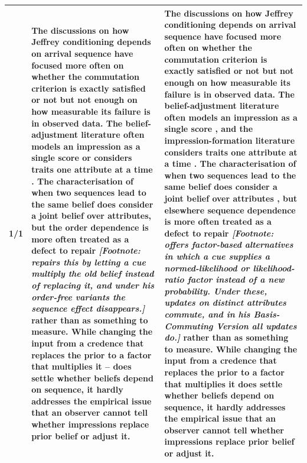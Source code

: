 \documentclass[10pt]{article}
\theoremstyle{definition}
\renewcommand{\footnote}[1]{ \textit{[Footnote: #1]}}
\begin{document}
{\begin{longtable}{|p{0.9cm}|p{12.2cm}|p{12.2cm}|}
1/1 & The discussions on how Jeffrey\citep{Jeffrey1983} conditioning depends on arrival sequence have focused more often on whether the commutation criterion is exactly satisfied or not but not enough on how measurable its failure is in observed data. The belief-adjustment literature often models an impression as a single score \citep{Hawthorne2004} or considers traits one attribute at a time \citep{Asch1946}. The characterisation of when two sequences lead to the same belief does consider a joint belief over attributes\citet{DiaconisZabell1982}, but the order dependence is more often treated as a defect to repair \footnote{\citet{Hawthorne2004} repairs this by letting a cue multiply the old belief instead of replacing it, and under his order-free variants the sequence effect disappears.} rather than as something to measure. While changing the input from a credence that replaces the prior to a factor that multiplies it -- does settle whether beliefs depend on sequence, it hardly addresses the empirical issue that an observer cannot tell whether impressions replace prior belief or adjust it. & The discussions on how Jeffrey conditioning \citep{Jeffrey1983} depends on arrival sequence have focused more often on whether the commutation criterion is exactly satisfied or not but not enough on how measurable its failure is in observed data. The belief-adjustment literature often models an impression as a single score \citep{HogarthEinhorn1992}, and the impression-formation literature considers traits one attribute at a time \citep{Asch1946}. The characterisation of when two sequences lead to the same belief does consider a joint belief over attributes \citep{DiaconisZabell1982}, but elsewhere sequence dependence is more often treated as a defect to repair\footnote{\citet{Hawthorne2004} offers factor-based alternatives in which a cue supplies a normed-likelihood or likelihood-ratio factor instead of a new probability. Under these, updates on distinct attributes commute, and in his Basis-Commuting Version all updates do.} rather than as something to measure. While changing the input from a credence that replaces the prior to a factor that multiplies it does settle whether beliefs depend on sequence, it hardly addresses the empirical issue that an observer cannot tell whether impressions replace prior belief or adjust it. \\ \hline

\end{longtable}}
\end{document}
